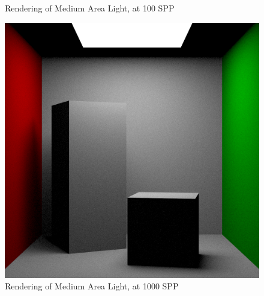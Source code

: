 \documentclass[a4paper]{myarticle}
\begin{document}
\begin{figure}[H]
\begin{minipage}[t]{.3\textwidth}
      \caption{Rendering of Medium Area Light, at 100 SPP}
  \end{minipage}
  \hfill
  \begin{minipage}[t]{.3\textwidth}
      \centering
      \includegraphics[width=\textwidth]{q3/med_1_1000.png}
      \caption{Rendering of Medium Area Light, at 1000 SPP}
  \end{minipage}
\end{figure}
\end{document}
